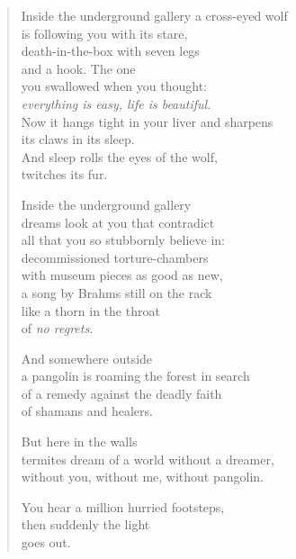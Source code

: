 \clearpage


\begin{verse}

Inside the underground gallery a cross-eyed wolf\\
is following you with its stare,\\
death-in-the-box with seven legs\\
and a hook. The one\\
you swallowed when you thought:\\
\emph{everything is easy, life is beautiful}.\\
Now it hangs tight in your liver and sharpens\\
its claws in its sleep.\\
And sleep rolls the eyes of the wolf,\\
twitches its fur.

Inside the underground gallery\\
dreams look at you that contradict\\
all that you so stubbornly believe in:\\
decommissioned torture-chambers\\
with museum pieces as good as new,\\
a song by Brahms still on the rack\\
like a thorn in the throat\\
of \emph{no regrets}.

And somewhere outside\\
a pangolin is roaming the forest in search\\
of a remedy against the deadly faith\\
of shamans and healers.

But here in the walls\\
termites dream of a world without a dreamer,\\
without you, without me, without pangolin.

You hear a million hurried footsteps,\\
then suddenly the light\\
goes out.

\end{verse}
